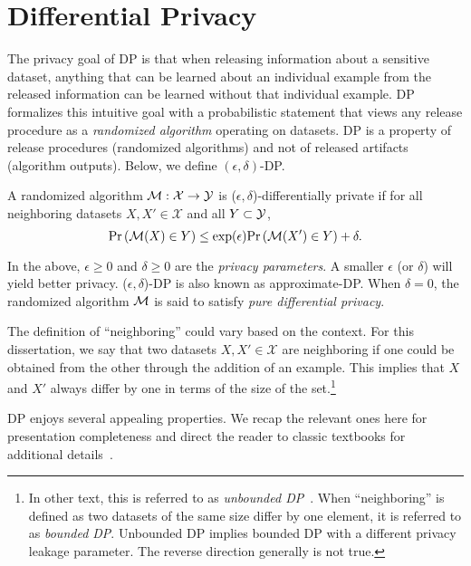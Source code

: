 \section{Differential Privacy}
The privacy goal of DP is that when releasing information about a sensitive dataset, anything that can be learned about an individual example from the released information can be learned without that individual example.
DP formalizes this intuitive goal with a probabilistic statement that views any release procedure as a \emph{randomized algorithm} operating on datasets.
DP is a property of release procedures (randomized algorithms) and not of released artifacts (algorithm outputs).
Below, we define $(\epsilon, \delta)$-DP.
\begin{defi}
A randomized algorithm $\mathcal{M}: \mathcal{X} \to \mathcal{Y}$ is ($\epsilon, \delta$)-differentially private if for all neighboring datasets $X, X'\in\mathcal{X}$ and all $Y \subset \mathcal{Y}$, 
$$
\mathrm{Pr}\left(\mathcal{M}(X) \in Y\right) \le \exp( \epsilon ) \mathrm{Pr}\left( \mathcal{M}(X') \in Y \right) + \delta.
\label{eq:epsilon_delta_dp}
$$
\end{defi}
In the above, $\epsilon \ge 0$ and $\delta \ge 0$ are the \emph{privacy parameters}.
A smaller $\epsilon$ (or $\delta$) will yield better privacy.
($\epsilon, \delta$)-DP is also known as approximate-DP.
When $\delta=0$, the randomized algorithm $\mathcal{M}$ is said to satisfy \emph{pure differential privacy}.

The definition of ``neighboring'' could vary based on the context. 
For this dissertation, we say that two datasets $X, X' \in \mathcal{X}$ are neighboring if one could be obtained from the other through the addition of an example. 
This implies that $X$ and $X'$ always differ by one in terms of the size of the set.\footnote{
In other text, this is referred to as \emph{unbounded DP}~\citep{kifer2011no}. When ``neighboring'' is defined as two datasets of the same size differ by one element, it is referred to as \emph{bounded DP}.
Unbounded DP implies bounded DP with a different privacy leakage parameter.
The reverse direction generally is not true.
}

DP enjoys several appealing properties. 
We recap the relevant ones here for presentation completeness and direct the reader to classic textbooks for additional details~\citep{dwork2014algorithmic,vadhan2017complexity}.

